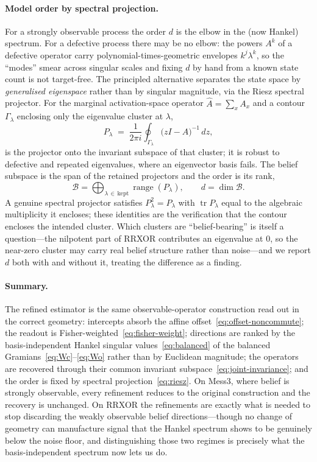 \documentclass[11pt]{article}
\begin{document}
\paragraph{Model order by spectral projection.}
For a strongly observable process the order $d$ is the elbow in the (now Hankel) spectrum. For
a defective process there may be no elbow: the powers $A^k$ of a defective operator carry
polynomial-times-geometric envelopes $k^{j}\lambda^k$, so the ``modes'' smear across singular
scales and fixing $d$ by hand from a known state count is not target-free. The principled
alternative separates the state space by \emph{generalised eigenspace} rather than by singular
magnitude, via the Riesz spectral projector. For the marginal activation-space operator
$\widehat A=\sum_x A_x$ and a contour $\Gamma_\lambda$ enclosing only the eigenvalue cluster
at $\lambda$,
\begin{equation}
P_\lambda \;=\; \frac{1}{2\pi i}\oint_{\Gamma_\lambda}\!\bigl(zI-\widehat A\bigr)^{-1}\,dz ,
\label{eq:riesz}
\end{equation}
is the projector onto the invariant subspace of that cluster; it is robust to defective and
repeated eigenvalues, where an eigenvector basis fails. The belief subspace is the span of the
retained projectors and the order is its rank,
\begin{equation}
\mathcal{B}=\bigoplus_{\lambda\,\in\,\text{kept}}\operatorname{range}(P_\lambda),
\qquad d=\dim\mathcal{B}.
\label{eq:riesz-subspace}
\end{equation}
A genuine spectral projector satisfies $P_\lambda^2=P_\lambda$ with $\operatorname{tr}
P_\lambda$ equal to the algebraic multiplicity it encloses; these identities are the
verification that the contour encloses the intended cluster. Which clusters are
``belief-bearing'' is itself a question---the nilpotent part of RRXOR contributes an
eigenvalue at $0$, so the near-zero cluster may carry real belief structure rather than
noise---and we report $d$ both with and without it, treating the difference as a finding.

\paragraph{Summary.}
The refined estimator is the same observable-operator construction read out in the correct
geometry: intercepts absorb the affine offset~\eqref{eq:offset-noncommute}; the readout is
Fisher-weighted~\eqref{eq:fisher-weight}; directions are ranked by the basis-independent
Hankel singular values~\eqref{eq:balanced} of the balanced Gramians~\eqref{eq:Wc}--\eqref{eq:Wo}
rather than by Euclidean magnitude; the operators are recovered through their common invariant
subspace~\eqref{eq:joint-invariance}; and the order is fixed by spectral
projection~\eqref{eq:riesz}. On Mess3, where belief is strongly observable, every refinement
reduces to the original construction and the recovery is unchanged. On RRXOR the refinements
are exactly what is needed to stop discarding the weakly observable belief directions---though
no change of geometry can manufacture signal that the Hankel spectrum shows to be genuinely
below the noise floor, and distinguishing those two regimes is precisely what the
basis-independent spectrum now lets us do.
\end{document}
